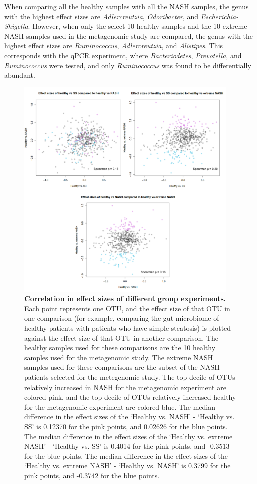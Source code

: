 When comparing all the healthy samples with all the NASH samples, the genus with the highest effect sizes are \textit{Adlercreutzia}, \textit{Odoribacter}, and \textit{Escherichia-Shigella}. However, when only the select 10 healthy samples and the 10 extreme NASH samples used in the metagenomic study are compared, the genus with the highest effect sizes are \textit{Ruminococcus}, \textit{Adlercreutzia}, and \textit{Alistipes}. This corresponds with the qPCR experiment, where \textit{Bacteriodetes}, \textit{Prevotella}, and \textit{Ruminococcus} were tested, and only \textit{Ruminococcus} was found to be differentially abundant.

\begin{figure}[h]
\begin{center}
\includegraphics[width=0.95\textwidth]{nafld_16s_effect_sizes.png}
\caption[Correlation in effect sizes of different group experiments.]{\textbf{Correlation in effect sizes of different group experiments.} Each point represents one OTU, and the effect size of that OTU in one comparison (for example, comparing the gut microbiome of healthy patients with patients who have simple steatosis) is plotted against the effect size of that OTU in another comparison. The healthy samples used for these comparisons are the 10 healthy samples used for the metagenomic study. The extreme NASH samples used for these comparisons are the subset of the NASH patients selected for the metegenomic study. The top decile of OTUs relatively increased in NASH for the metagenomic experiment are colored pink, and the top decile of OTUs relatively increased healthy for the metagenomic experiment are colored blue. The median difference in the effect sizes of the `Healthy vs. NASH' - `Healthy vs. SS' is 0.12370 for the pink points, and 0.02626 for the blue points. The median difference in the effect sizes of the `Healthy vs. extreme NASH' - `Healthy vs. SS' is 0.4014 for the pink points, and -0.3513 for the blue points. The median difference in the effect sizes of the `Healthy vs. extreme NASH' - `Healthy vs. NASH' is 0.3799 for the pink points, and -0.3742 for the blue points. }

\end{center}
\end{figure}
